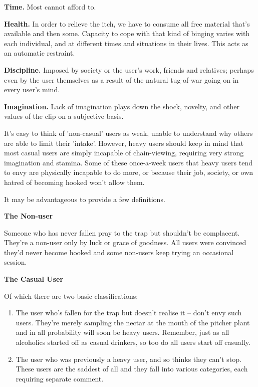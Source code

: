 \documentclass[
]{book}
\begin{document}
\textbf{Time.}
Most cannot afford to.

\textbf{Health.}
In order to relieve the itch, we have to consume all free material that's available and then some. Capacity to cope with that kind of binging varies with each individual, and at different times and situations in their lives. This acts as an automatic restraint.

\textbf{Discipline.}
Imposed by society or the user's work, friends and relatives; perhaps even by the user themselves as a result of the natural tug-of-war going on in every user's mind.

\textbf{Imagination.}
Lack of imagination plays down the shock, novelty, and other values of the clip on a subjective basis.

It's easy to think of 'non-casual' users as weak, unable to understand why others are able to limit their 'intake'. However, heavy users should keep in mind that most casual users are simply incapable of chain-viewing, requiring very strong imagination and stamina. Some of these once-a-week users that heavy users tend to envy are physically incapable to do more, or because their job, society, or own hatred of becoming hooked won't allow them.

It may be advantageous to provide a few definitions.

\textbf{The Non-user}

Someone who has never fallen pray to the trap but shouldn't be complacent. They're a non-user only by luck or grace of goodness. All users were convinced they'd never become hooked and some non-users keep trying an occasional session.

\textbf{The Casual User}

Of which there are two basic classifications:

\begin{enumerate}
\def\labelenumi{\arabic{enumi}.}
\item
  The user who's fallen for the trap but doesn't realise it -- don't envy such users. They're merely sampling the nectar at the mouth of the pitcher plant and in all probability will soon be heavy users. Remember, just as all alcoholics started off as casual drinkers, so too do all users start off casually.
\item
  The user who was previously a heavy user, and so thinks they can't stop. These users are the saddest of all and they fall into various categories, each requiring separate comment.
\end{enumerate}
\end{document}
